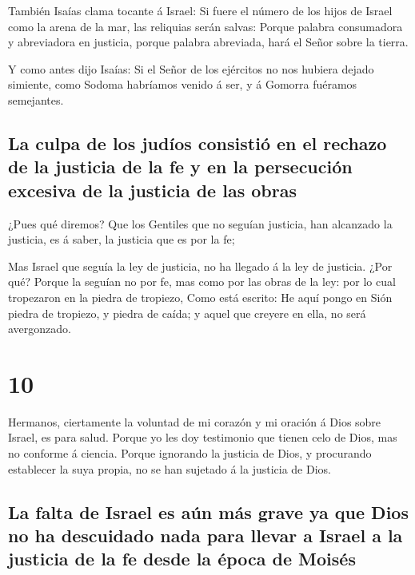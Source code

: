  También Isaías clama tocante á Israel: Si fuere el
número de los hijos de Israel como la arena de la mar, las reliquias
serán salvas:  Porque palabra consumadora y abreviadora
en justicia, porque palabra abreviada, hará el Señor sobre la tierra.

 Y como antes dijo Isaías: Si el Señor de los ejércitos
no nos hubiera dejado simiente, como Sodoma habríamos venido á ser, y á
Gomorra fuéramos semejantes.

\hypertarget{la-culpa-de-los-juduxedos-consistiuxf3-en-el-rechazo-de-la-justicia-de-la-fe-y-en-la-persecuciuxf3n-excesiva-de-la-justicia-de-las-obras}{%
\subsection{La culpa de los judíos consistió en el rechazo de la
justicia de la fe y en la persecución excesiva de la justicia de las
obras}\label{la-culpa-de-los-juduxedos-consistiuxf3-en-el-rechazo-de-la-justicia-de-la-fe-y-en-la-persecuciuxf3n-excesiva-de-la-justicia-de-las-obras}}

 ¿Pues qué diremos? Que los Gentiles que no seguían
justicia, han alcanzado la justicia, es á saber, la justicia que es por
la fe;

 Mas Israel que seguía la ley de justicia, no ha llegado
á la ley de justicia.  ¿Por qué? Porque la seguían no por
fe, mas como por las obras de la ley: por lo cual tropezaron en la
piedra de tropiezo,  Como está escrito: He aquí pongo en
Sión piedra de tropiezo, y piedra de caída; y aquel que creyere en ella,
no será avergonzado.

\hypertarget{section-9}{%
\section{10}\label{section-9}}

 Hermanos, ciertamente la voluntad de mi corazón y mi
oración á Dios sobre Israel, es para salud.  Porque yo les
doy testimonio que tienen celo de Dios, mas no conforme á ciencia.
 Porque ignorando la justicia de Dios, y procurando
establecer la suya propia, no se han sujetado á la justicia de Dios.

\hypertarget{la-falta-de-israel-es-auxfan-muxe1s-grave-ya-que-dios-no-ha-descuidado-nada-para-llevar-a-israel-a-la-justicia-de-la-fe-desde-la-uxe9poca-de-moisuxe9s}{%
\subsection{La falta de Israel es aún más grave ya que Dios no ha
descuidado nada para llevar a Israel a la justicia de la fe desde la
época de
Moisés}\label{la-falta-de-israel-es-auxfan-muxe1s-grave-ya-que-dios-no-ha-descuidado-nada-para-llevar-a-israel-a-la-justicia-de-la-fe-desde-la-uxe9poca-de-moisuxe9s}}

